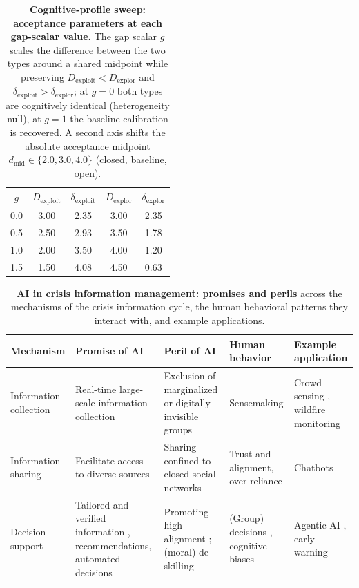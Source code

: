 \documentclass[11pt]{article}
\begin{document}
\begin{table}[h!]
\centering
\caption{\textbf{Cognitive-profile sweep: acceptance parameters at each
gap-scalar value.} The gap scalar $g$ scales the difference between the
two types around a shared midpoint while preserving
$D_{\mathrm{exploit}} < D_{\mathrm{explor}}$ and
$\delta_{\mathrm{exploit}} > \delta_{\mathrm{explor}}$; at $g = 0$ both
types are cognitively identical (heterogeneity null), at $g = 1$ the
baseline calibration is recovered. A second axis shifts the absolute
acceptance midpoint $d_{\mathrm{mid}} \in \{2.0, 3.0, 4.0\}$ (closed,
baseline, open).}\label{tab:s9-gap}
\begin{tabular}{@{}ccccc@{}}
\toprule
$g$ & $D_{\mathrm{exploit}}$ & $\delta_{\mathrm{exploit}}$ & $D_{\mathrm{explor}}$ & $\delta_{\mathrm{explor}}$ \\
\midrule
0.0 & 3.00 & 2.35 & 3.00 & 2.35 \\
0.5 & 2.50 & 2.93 & 3.50 & 1.78 \\
1.0 & 2.00 & 3.50 & 4.00 & 1.20 \\
1.5 & 1.50 & 4.08 & 4.50 & 0.63 \\
\bottomrule
\end{tabular}
\end{table}

\begin{table}[h!]
\centering
\caption{\textbf{AI in crisis information management: promises and
perils} across the mechanisms of the crisis information cycle, the human
behavioral patterns they interact with, and example
applications.}\label{tab:s10-promises}
\footnotesize
\begin{tabular}{@{}p{2.0cm}p{2.6cm}p{2.6cm}p{2.6cm}p{2.8cm}@{}}
\toprule
Mechanism & Promise of AI & Peril of AI & Human behavior & Example application \\
\midrule
Information collection & Real-time large-scale information collection \citep{narmatha2025disaster} & Exclusion of marginalized or digitally invisible groups \citep{coleman2024weaving} & Sensemaking \citep{klein2010rapid} & Crowd sensing \citep{mai2025evaluating}, wildfire monitoring \citep{roy2024multi} \\
Information sharing & Facilitate access to diverse sources \citep{jeon2024hearhere} & Sharing confined to closed social networks & Trust and alignment, over-reliance \citep{manzini2024should} & Chatbots \citep{urbanelli2024ermes} \\
Decision support & Tailored and verified information \citep{zhao2025tailoring}, recommendations, automated decisions & Promoting high alignment \citep{manzini2024should}; (moral) de-skilling \citep{vallor2015moral} & (Group) decisions \citep{comes2024ai}, cognitive biases \citep{paulus2022influence} & Agentic AI \citep{acharya2025agentic}, early warning \citep{reichstein2025early} \\
\bottomrule
\end{tabular}
\end{table}
\end{document}
